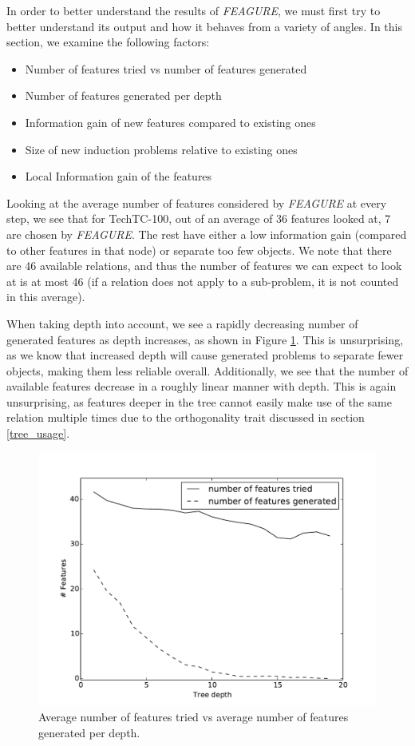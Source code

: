 \documentclass[twoside,11pt]{article}
\theoremstyle{definition}
\begin{document}
In order to better understand the results of \emph{FEAGURE}, we must first try to better understand its output and how it behaves from a variety of angles.
In this section, we examine the following factors:
\begin{itemize}
	\item Number of features tried vs number of features generated
	\item Number of features generated per depth
	\item Information gain of new features compared to existing ones
	\item Size of new induction problems relative to existing ones
	\item Local Information gain of the features
\end{itemize}

Looking at the average number of features considered by \emph{FEAGURE} at every step, we see that for TechTC-100, out of an average of 36 features looked at, 7 are chosen by \emph{FEAGURE}. The rest have either a low information gain (compared to other features in that node) or separate too few objects.
We note that there are 46 available relations, and thus the number of features we can expect to look at is at most 46 (if a relation does not apply to a sub-problem, it is not counted in this average). 

When taking depth into account, we see a rapidly decreasing number of generated features as depth increases, as shown in Figure \ref{fig:features_per_depth}.
This is unsurprising, as we know that increased depth will cause generated problems to separate fewer objects, making them less reliable overall. Additionally, we see that the number of available features decrease in a roughly linear manner with depth. This is again unsurprising, as features deeper in the tree cannot easily make use of the same relation multiple times due to the orthogonality trait discussed in section \ref{tree_usage}.

\begin{figure}[h!]
	\centering
	\includegraphics[scale=0.4]{features_per_depth}
	\caption{Average number of features tried vs average number of features generated per depth.}
	\label{fig:features_per_depth}
\end{figure}
\end{document}
